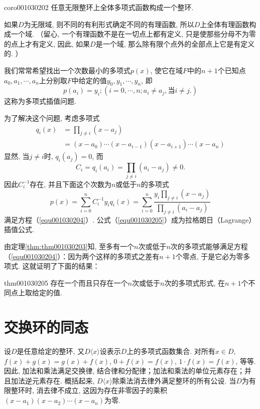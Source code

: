 \begin{corollary}{}{coro001030202}
任意无限整环上全体多项式函数构成一个整环. 
\end{corollary}

如果$D$为无限域, 则不同的有利形式确定不同的有理函数, 所以$D$上全体有理函数构成一个域. （留心, 一个有理函数不是在一切点上都有定义, 只是使那些分母不为零的点上才有定义, 因此, 如果$D$是一个域, 那么除有限个点外的全部点上它是有定义的. ）

我们常常希望找出一个次数最小的多项式$p(x)$, 使它在域$F$中的$n+1$个已知点$a_0,a_1,\cdots,a_n$上分别取$F$中给定的值$y_0,y_1,\cdots,y_n$, 即
\begin{equation}\label{equ001030204}
p(a_i) = y_i;(i=0,\cdots,n;a_i \neq a_j,\text{当}i\neq j.)
\end{equation}
这称为多项式插值问题. 

为了解决这个问题, 考虑多项式
\[
\begin{aligned}
q_i(x) &= \prod_{j \neq i}{(x-a_j)}\\
&=(x-a_0)\cdots(x-a_{i-1})(x-a_{i+1})\cdots(x-a_n)
\end{aligned}
\]
显然, 当$j \neq i$时, $q_i(a_j)=0$, 而
\[
C_i=q_i(a_i) = \prod_{j \neq i}{(a_i - a_j)} \neq 0.
\]
因此$C_i^{-1}$存在, 并且下面这个次数为$n$或低于$n$的多项式
\begin{equation}\label{equ001030205}
p(x)=\sum_{i=0}^{n}{C_i^{-1}y_iq_i(x)}=\sum_{i=0}^{n}{\frac{y_i\prod_{j \neq i}{(x-a_j)}}{\prod_{j \neq i}{(a_i - a_j)}}}
\end{equation}
满足方程（\ref{equ001030204}）. 公式（\ref{equ001030205}）成为拉格朗日（Lagrange）插值公式. 

由定理\ref{thm:thm001030203}知, 至多有一个$n$次或低于$n$次的多项式能够满足方程（\ref{equ001030204}）：因为两个这样的多项式之差有$n+1$个零点, 于是它必为零多项式. 这就证明了下面的结果：
\begin{theorem}{}{thm001030205}
存在一个而且只存在一个$n$次或低于$n$次的多项式形式, 在$n+1$个不同点上取给定的值. 
\end{theorem}



\section{交换环的同态}\label{subsection0010303}
设$D$是任意给定的整环, 又$D\langle{}x\rangle$设表示$D$上的多项式函数集合. 对所有$x \in D$, $f(x)+g(x)=g(x)+f(x)$, $0+f(x)=f(x)$, $1 \cdot f(x)=f(x)$, 等等. 因此, 加法和乘法满足交换律, 结合律和分配律；加法和乘法的单位元素存在；并且加法逆元素存在. 概括起来, $D\langle{}x\rangle$除乘法消去律外满足整环的所有公设. 当$D$为有限整环时, 消去律不成立, 这因为存在非零因子的乘积$(x-a_1)(x-a_2)\cdots(x-a_n)$为零. 

